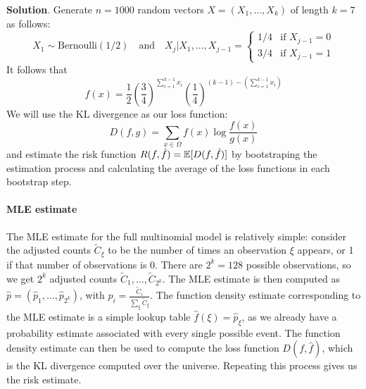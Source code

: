 \textbf{Solution}.
Generate \(n = 1000\) random vectors \(X = (X_{1}, \dots, X_{k})\) of
length \(k = 7\) as follows:
\[
X_{1} \sim \text{Bernoulli}(1/2) 
\quad \text{and} \quad
X_{j} | X_{1}, \dots, X_{j-1} = \begin{cases}
1/4 & \text{if } X_{j-1} = 0 \\
3/4 & \text{if } X_{j-1} = 1
\end{cases}
\]
It follows that
\[
f(x) = \frac{1}{2} \left( \frac{3}{4} \right)^{\sum_{i=1}^{k - 1} x_{i}} \left( \frac{1}{4} \right)^{(k - 1) - \left(\sum_{i=1}^{k - 1} x_{i} \right)}
\]
We will use the KL divergence as our loss function:
\[
D(f, g) = \sum_{x \in \Omega} f(x) \log \frac{f(x)}{g(x)}
\]
and estimate the risk function
\(R(f, \hat{f}) = \operatorname{\mathbb{E}}[D(f, \hat{f})]\) by bootstraping the
estimation process and calculating the average of the loss functions in
each bootstrap step.
\paragraph{MLE estimate}\label{mle-estimate}
The MLE estimate for the full multinomial model is relatively simple:
consider the adjusted counts \(\tilde{C}_{\xi}\) to be the number of
times an observation \(\xi\) appears, or 1 if that number of
observations is 0. There are \(2^{k} = 128\) possible observations, so we
get \(2^{k}\) adjusted counts \(\tilde{C}_{1}, \dots, \tilde{C}_{2^{k}}\). The
MLE estimate is then computed as
\(\hat{p} = (\hat{p}_{1}, \dots, \hat{p}_{2^{k}})\), with
\(\hat{p}_{i} = \frac{\tilde{C}_{i}}{\sum_\xi \tilde{C}_\xi}\).
The function density estimate corresponding to the MLE estimate is a
simple lookup table \(\hat{f}(\xi) = \hat{p}_\xi\), as we already have a
probability estimate associated with every single possible event. The
function density estimate can then be used to compute the loss function
\(D(f, \hat{f})\), which is the KL divergence computed over the
universe. Repeating this process gives us the risk estimate.

